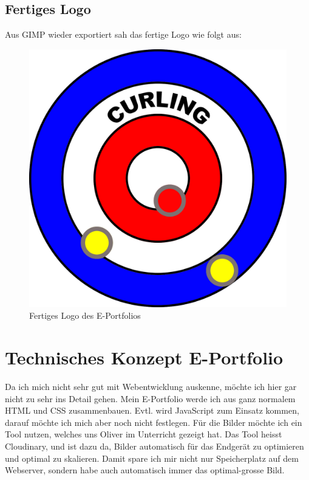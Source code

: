 \documentclass[11pt]{article}
\begin{document}
    \subsection{Fertiges Logo}
    Aus GIMP wieder exportiert sah das fertige Logo wie folgt aus:

    \begin{figure}[h]
        \includegraphics[width=\textwidth]{media/curling_logo}
        \caption{Fertiges Logo des E-Portfolios}
    \end{figure}

    \pagebreak

    \section{Technisches Konzept E-Portfolio}
    Da ich mich nicht sehr gut mit Webentwicklung auskenne, möchte ich hier gar nicht zu sehr ins Detail gehen.
    Mein E-Portfolio werde ich aus ganz normalem HTML und CSS zusammenbauen. Evtl. wird JavaScript zum Einsatz kommen,
    darauf möchte ich mich aber noch nicht festlegen.
    Für die Bilder möchte ich ein Tool nutzen, welches uns Oliver im Unterricht gezeigt hat. Das Tool heisst Cloudinary,
    und ist dazu da, Bilder automatisch für das Endgerät zu optimieren und optimal zu skalieren. Damit spare ich mir
    nicht nur Speicherplatz auf dem Webserver, sondern habe auch automatisch immer das optimal-grosse Bild.
\end{document}
